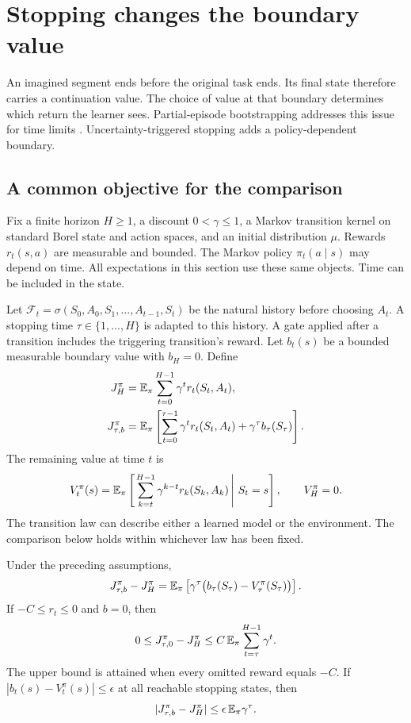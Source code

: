 \section{Stopping changes the boundary value}
\label{sec:stopping}

An imagined segment ends before the original task ends. Its final state therefore carries a continuation value. The choice of value at that boundary determines which return the learner sees. Partial-episode bootstrapping addresses this issue for time limits \cite{pardo}. Uncertainty-triggered stopping adds a policy-dependent boundary.

\subsection{A common objective for the comparison}

Fix a finite horizon $H\ge1$, a discount $0<\gamma\le1$, a Markov transition kernel on standard Borel state and action spaces, and an initial distribution $\mu$. Rewards $r_t(s,a)$ are measurable and bounded. The Markov policy $\pi_t(a\mid s)$ may depend on time. All expectations in this section use these same objects. Time can be included in the state.

Let $\mathcal F_t=\sigma(S_0,A_0,S_1,\ldots,A_{t-1},S_t)$ be the natural history before choosing $A_t$. A stopping time $\tau\in\{1,\ldots,H\}$ is adapted to this history. A gate applied after a transition includes the triggering transition's reward. Let $b_t(s)$ be a bounded measurable boundary value with $b_H=0$. Define
\begin{align}
J_H^\pi&=\mathbb{E}_\pi\sum_{t=0}^{H-1}\gamma^t r_t(S_t,A_t),\\
J_{\tau,b}^\pi&=\mathbb{E}_\pi\left[\sum_{t=0}^{\tau-1}\gamma^t r_t(S_t,A_t)+\gamma^\tau b_\tau(S_\tau)\right].
\end{align}
The remaining value at time $t$ is
\begin{equation}
V_t^\pi(s)=\mathbb{E}_\pi\left[\left.\sum_{k=t}^{H-1}\gamma^{k-t}r_k(S_k,A_k)\,\right|\,S_t=s\right],\qquad V_H^\pi=0.
\end{equation}
The transition law can describe either a learned model or the environment. The comparison below holds within whichever law has been fixed.

\begin{proposition}
\label{prop:boundary}
Under the preceding assumptions,
\begin{equation}
J_{\tau,b}^\pi-J_H^\pi
=\mathbb{E}_\pi\left[\gamma^\tau\bigl(b_\tau(S_\tau)-V_\tau^\pi(S_\tau)\bigr)\right].
\label{eq:boundary-error}
\end{equation}
If $-C\le r_t\le0$ and $b=0$, then
\begin{equation}
0\le J_{\tau,0}^\pi-J_H^\pi
\le C\,\mathbb{E}_\pi\sum_{t=\tau}^{H-1}\gamma^t.
\label{eq:boundary-bound}
\end{equation}
The upper bound is attained when every omitted reward equals $-C$. If $|b_t(s)-V_t^\pi(s)|\le\epsilon$ at all reachable stopping states, then
\begin{equation}
|J_{\tau,b}^\pi-J_H^\pi|\le\epsilon\,\mathbb{E}_\pi\gamma^\tau.
\end{equation}
\end{proposition}

